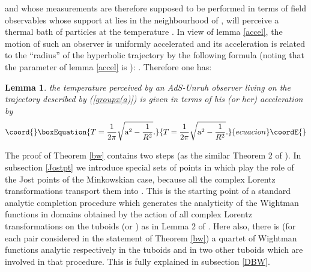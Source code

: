 \documentclass[a4paper,a4paper]{article}
\newtheorem{lemma}{Lemma}[section]
\def\ZZ{{\cal Z}}
\begin{document}
and whose measurements are therefore supposed to be performed
in terms of field observables whose support
at \coordHE{} lies in the
neighbourhood \coordHE{} of \coordHE{},
will perceive a thermal bath of particles
at the temperature \coordHE{}.
In view of lemma \ref{accel}, the motion of such an observer is
uniformly accelerated and its acceleration \coordHE{} is related
to the ``radius'' \coordHE{} of the hyperbolic trajectory
by the following formula (noting that the parameter \coordHE{} of
lemma \ref{accel} is \coordHE{}):
\coordHE{}.
Therefore one has:
\begin{lemma}
\label{temperature}
the temperature \coordHE{} perceived by an AdS-Unruh observer living
on the trajectory described by  (\ref{groupx(a)}) is given
in terms of his (or her) acceleration \coordHE{}
by
\begin{equation}\coord{}\boxEquation{
T={1\over 2\pi} \sqrt {{\rm a}^2 -{1\over R^2}}.
\label{tempeq}}{
T={1\over 2\pi} \sqrt {{\rm a}^2 -{1\over R^2}}.
}{ecuacion}\coordE{}\end{equation}
\end{lemma}

\vskip 0.2cm
The proof of Theorem \ref{bw} contains two steps (as the similar
Theorem 2 of \cite{BEM}). In subsection \ref{Jostpt} we introduce
special sets of points in \coordHE{} which play the role of the
Jost points of the Minkowskian case, because
all the complex Lorentz transformations \myHighlight{$[\lambda]$}\coordHE{}
transport them into \myHighlight{$\ZZ_{n+}\cup\ZZ_{n-}$}\coordHE{}.
This is the starting point of a standard analytic
completion procedure which generates the analyticity of the
Wightman functions in domains obtained by the action of all
complex Lorentz transformations on the tuboids
\myHighlight{$\ZZ_{n+}$}\coordHE{}
(or \myHighlight{$\ZZ_{n-}$}\coordHE{}) as in Lemma 2 of \cite{BEM}.
Here also, there is (for each pair \coordHE{} considered in the statement of
Theorem \ref{bw}) a quartet of Wightman functions analytic
respectively in the tuboids
\myHighlight{$\ZZ_{n\pm}$}\coordHE{}
and in two other tuboids
\myHighlight{$\ZZ'_{n\pm}$}\coordHE{}
which are involved in that procedure. This is
fully explained in subsection \ref{DBW}.
\end{document}
